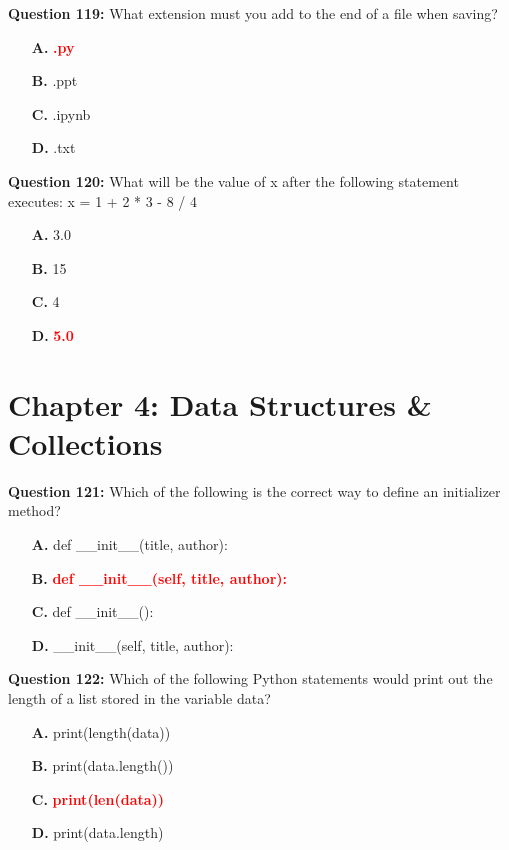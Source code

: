 \documentclass[12pt,a4paper]{article}
\begin{document}
\textbf{Question 119:} What extension must you add to the end of a file when saving?

\begin{itemize}
    \item[\textbf{A.}] \textcolor{red}{\textbf{.py}}
    \item[\textbf{B.}] .ppt
    \item[\textbf{C.}] .ipynb
    \item[\textbf{D.}] .txt
\end{itemize}

\vspace{0.5cm}

\textbf{Question 120:} What will be the value of x after the following statement executes: x = 1 + 2 * 3 - 8 / 4

\begin{itemize}
    \item[\textbf{A.}] 3.0
    \item[\textbf{B.}] 15
    \item[\textbf{C.}] 4
    \item[\textbf{D.}] \textcolor{red}{\textbf{5.0}}
\end{itemize}

\vspace{0.5cm}

\section{Chapter 4: Data Structures & Collections}

\textbf{Question 121:} Which of the following is the correct way to define an initializer method?

\begin{itemize}
    \item[\textbf{A.}] def __init__(title, author):
    \item[\textbf{B.}] \textcolor{red}{\textbf{def __init__(self, title, author):}}
    \item[\textbf{C.}] def __init__():
    \item[\textbf{D.}] __init__(self, title, author):
\end{itemize}

\vspace{0.5cm}

\textbf{Question 122:} Which of the following Python statements would print out the length of a list stored in the variable data?

\begin{itemize}
    \item[\textbf{A.}] print(length(data))
    \item[\textbf{B.}] print(data.length())
    \item[\textbf{C.}] \textcolor{red}{\textbf{print(len(data))}}
    \item[\textbf{D.}] print(data.length)
\end{itemize}
\end{document}
